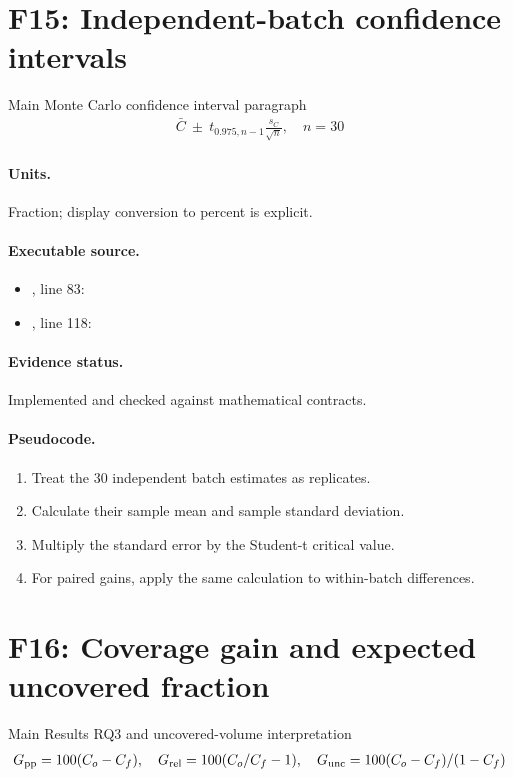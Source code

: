 \documentclass[10pt]{article}
\begin{document}
\section*{F15: Independent-batch confidence intervals}
Main Monte Carlo confidence interval paragraph
\begin{gather*}\bar C\ \pm\ t_{0.975,n-1}\frac{s_C}{\sqrt n},\quad n=30\end{gather*}
\paragraph{Units.} Fraction; display conversion to percent is explicit.
\paragraph{Executable source.}
\begin{itemize}[leftmargin=*]
\item {}, line 83: 
\item {}, line 118: 
\end{itemize}
\paragraph{Evidence status.} Implemented and checked against mathematical contracts.
\paragraph{Pseudocode.}
\begin{enumerate}[leftmargin=*]
\item Treat the 30 independent batch estimates as replicates.
\item Calculate their sample mean and sample standard deviation.
\item Multiply the standard error by the Student-t critical value.
\item For paired gains, apply the same calculation to within-batch differences.
\end{enumerate}
\newpage
\section*{F16: Coverage gain and expected uncovered fraction}
Main Results RQ3 and uncovered-volume interpretation
\begin{gather*}G_{\rm pp}=100(C_o-C_f),\quad G_{\rm rel}=100(C_o/C_f-1),\quad G_{\rm unc}=100(C_o-C_f)/(1-C_f)\end{gather*}
\end{document}
